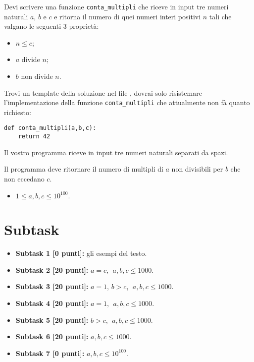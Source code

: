 \renewcommand{\nomebreve}{conta\_multipli}
\renewcommand{\titolo}{Conta i multipli di a non divisibili per b}

\introduzione{}

Devi scrivere una funzione {\tt conta\_multipli} che riceve in input tre numeri naturali $a$, $b$ e $c$ e ritorna il numero di quei numeri interi positivi $n$ tali che valgano le seguenti 3 proprietà:
\begin{itemize}
   \item $n\leq c$;
   \item $a$ divide $n$;
   \item $b$ non divide $n$.
\end{itemize}

Trovi un template della soluzione nel file \textbf{}, dovrai solo risistemare l'implementazione della funzione {\tt conta\_multipli} che attualmente non fà quanto richiesto: 

\begin{verbatim}
def conta_multipli(a,b,c):
    return 42
\end{verbatim}


Il vostro programma riceve in input tre numeri naturali separati da spazi.


Il programma deve ritornare il numero di multipli di $a$ non divisibili per $b$ che non eccedano $c$.




\begin{itemize}[nolistsep, noitemsep]
  \item $1 \le a,b,c \le 10^{100}$.
\end{itemize}

  \section*{Subtask}
  \begin{itemize}
    \item \textbf{Subtask 1 [0 punti]:} gli esempi del testo.
    \item \textbf{Subtask 2 [20 punti]:} $a=c$, $\;a,b,c\leq 1000$.
    \item \textbf{Subtask 3 [20 punti]:} $a=1$, $b>c$, $\;a,b,c\leq 1000$.
    \item \textbf{Subtask 4 [20 punti]:} $a=1$, $\;a,b,c\leq 1000$.
    \item \textbf{Subtask 5 [20 punti]:} $b>c$, $\;a,b,c\leq 1000$.
    \item \textbf{Subtask 6 [20 punti]:} $a,b,c \leq 1000$.
    \item \textbf{Subtask 7 [0 punti]:} $a,b,c \leq 10^{100}$.
  \end{itemize}
  
